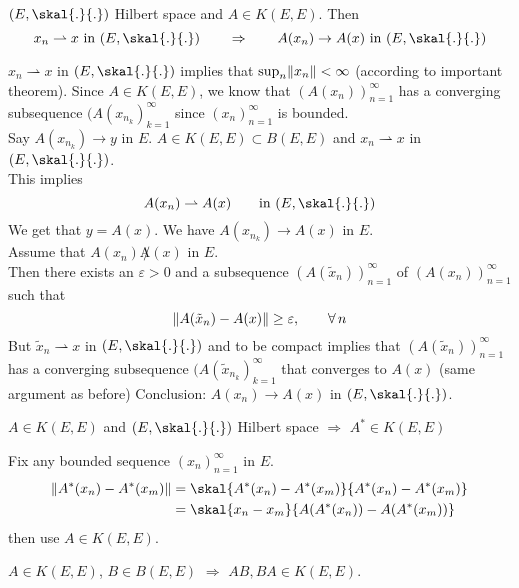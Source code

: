 \begin{proposition}
	$(E,\skal{.}{.})$ Hilbert space and $A \in K(E,E)$. Then \[
		x_n \rightharpoonup x \text{ in } (E, \skal{.}{.}) \qquad \Rightarrow \qquad A(x_n) \to A(x) \text{ in }(E,\skal{.}{.})
	\]
\end{proposition}
\begin{beweis}
	$x_n \rightharpoonup x$ in $(E,\skal{.}{.})$ implies that $\sup_n \norm{x_n}< \infty$ (according to important theorem). Since $A \in K(E,E)$, we know that $(A(x_n))_{n=1}^{\infty}$ has a converging subsequence $(A(x _{n_k})_{k=1}^{\infty}$ since $(x_n)_{n=1}^{\infty}$ is bounded. \\
	Say $A(x _{n_k}) \to y$ in $E$. $A \in K(E,E) \subset B(E,E)$ and $x_n \rightharpoonup x$ in $(E, \skal{.}{.})$. \\
	This implies
	\[
		A(x_n) \rightharpoonup A(x) \qquad \text{in }(E,\skal{.}{.})
	\]
	We get that $y = A(x)$. We have $A(x _{n_k}) \to A(x)$ in $E$. \\
	Assume that $A(x_n) \not A(x)$ in $E$. \\
	Then there exists an $\varepsilon >0$ and a subsequence $(A(\tilde x_n))_{n=1}^{\infty}$ of $(A(x_n))_{n=1}^{\infty}$ such that
	\[
		\norm{A( \tilde x_n) - A(x)} \geq \varepsilon, \qquad \forall\,  n
	\]
	But $\tilde x_n \rightharpoonup x$ in $(E,\skal{.}{.})$ and to be compact implies that $(A(\tilde x_n))_{n=1}^{\infty}$ has a converging subsequence $(A( \tilde x _{n_k})_{k=1}^{\infty}$ that converges to $A(x)$ (same argument as before)
	Conclusion: $A(x_n) \to A(x)$ in $(E, \skal{.}{.})$.
\end{beweis}

\begin{proposition}
	$A \in K(E,E)$ and $(E, \skal{.}{.})$ Hilbert space \qquad $\Rightarrow $ $A^* \in K(E,E)$
\end{proposition}
\begin{beweis}
	Fix any bounded sequence $(x_n)_{n=1}^{\infty}$ in $E$. 
	\begin{align*}
		\norm{A^*(x_n)-A^*(x_m)} &= \skal{A^*(x_n)-A^*(x_m)}{A^*(x_n)-A^*(x_m)} \\
		&= \skal{x_n-x_m}{A(A^*(x_n))-A(A^*(x_m))} 
	\end{align*}
	then use $A \in K(E,E)$.
\end{beweis}

\begin{proposition}
	$A \in K(E,E)$, $B \in B(E,E)$ \qquad $\Rightarrow $ $AB,BA \in K(E,E)$.
\end{proposition}

